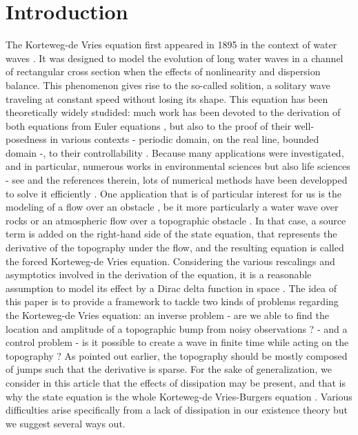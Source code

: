 
\section{Introduction}

The Korteweg-de Vries equation first appeared in 1895 in the context of water waves \cite{korteweg1895xli}. It was designed to model the evolution of long water waves in a channel of rectangular cross section when the effects of nonlinearity and dispersion balance. This phenomenon gives rise to the so-called solition, a solitary wave traveling at constant speed without losing its shape. This equation has been theoretically widely studided: much work has been devoted to the derivation of both equations from Euler equations \cite{shen1992forced,constantin2008,su2003korteweg}, but also to the proof of their well-posedness in various contexts \cite{miura1976korteweg,kenig1993,bourgain1997periodic} - periodic domain, on the real line, bounded domain -, to their controllability \cite{rosier1997exact,glass2008some,coron2003exact,chapouly2009global}. 
Because many applications were investigated, and in particular, numerous works in environmental sciences but also life sciences - see \cite{dauxois2006physics,whitham2011linear,Crepeau2007594,yomosa1987} and the references therein, lots of numerical methods have been developped to solve it efficiently \cite{trefethen2000spectral,shen2003new,ma2000legendre}. One application that is of particular interest for us is the modeling of a flow over an obstacle \cite{milewski2004forced,shen1992forced,shen1996accuracy}, be it more particularly a water wave over rocks or an atmospheric flow over a topographic obstacle \cite{baines1997topographic}. In that case, a source term is added on the right-hand side of the state equation, that represents the derivative of the topography under the flow, and the resulting equation is called the forced Korteweg-de Vries equation. Considering the various rescalings and asymptotics involved in the derivation of the \KdV equation, it is a reasonable assumption to model its effect by a Dirac delta function in space \cite{shen1996accuracy, shen2000bumpdirac}. The idea of this paper is to provide a framework to tackle two kinds of problems regarding the Korteweg-de Vries equation: an inverse problem - are we able to find the location and amplitude of a topographic bump from noisy observations ? -  and a control problem - is it possible to create a wave in finite time while acting on the topography ? As pointed out earlier, the topography should be mostly composed of jumps such that the derivative is sparse. For the sake of generalization, we consider in this article that the effects of dissipation may be present, and that is why the state equation is the whole Korteweg-de Vries-Burgers equation \cite{su2003korteweg}. Various difficulties arise specifically from a lack of dissipation in our existence theory but we suggest several ways out.

